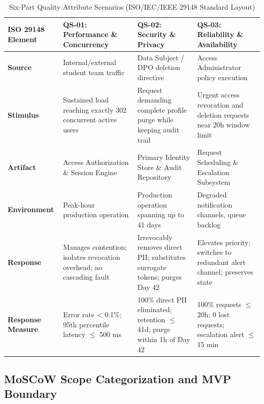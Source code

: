 \documentclass[10pt,a4paper]{article}
\begin{document}
\begin{table}[htbp]
\centering
\scriptsize
\begin{tabularx}{\textwidth}{|l|X|X|X|}
\hline
\textbf{ISO 29148 Element} & \textbf{QS-01: Performance \& Concurrency} & \textbf{QS-02: Security \& Privacy} & \textbf{QS-03: Reliability \& Availability} \\
\hline
\textbf{Source} & Internal/external student team traffic & Data Subject / DPO deletion directive & Access Administrator policy execution \\
\hline
\textbf{Stimulus} & Sustained load reaching exactly 302 concurrent active users & Request demanding complete profile purge while keeping audit trail & Urgent access revocation and deletion requests near 20h window limit \\
\hline
\textbf{Artifact} & Access Authorization \& Session Engine & Primary Identity Store \& Audit Repository & Request Scheduling \& Escalation Subsystem \\
\hline
\textbf{Environment} & Peak-hour production operation & Production operation spanning up to 41 days & Degraded notification channels, queue backlog \\
\hline
\textbf{Response} & Manages contention; isolates revocation overhead; no cascading fault & Irrevocably removes direct PII; substitutes surrogate tokens; purges Day 42 & Elevates priority; switches to redundant alert channel; preserves state \\
\hline
\textbf{Response Measure} & Error rate < 0.1\%; 95th percentile latency $\leq$ 500 ms & 100\% direct PII eliminated; retention $\leq$ 41d; purge within 1h of Day 42 & 100\% requests $\leq$ 20h; 0 lost requests; escalation alert $\leq$ 15 min \\
\hline
\end{tabularx}
\caption{Six-Part Quality Attribute Scenarios (ISO/IEC/IEEE 29148 Standard Layout)}
\label{tab:quality_scenarios_iso}
\end{table}

\subsection{MoSCoW Scope Categorization and MVP Boundary}
\end{document}
